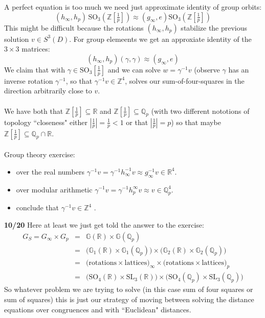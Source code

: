 \documentclass[12pt]{article}
\begin{document}
{A perfect equation is too much we need just approximate identity of group orbits:
$$ (h_\infty, h_p) \,\text{SO}_3 ( \mathbb{Z}[\tfrac{1}{p}] ) \approx (g_\infty, e)\text{SO}_3 ( \mathbb{Z}[\tfrac{1}{p}] ) $$
This might be difficult because the rotations 
$(h_\infty, h_p)$ stabilize the previous solution $v \in S^3(D)$.  For group elemeents we get an approxiate identity of the $3 \times 3$ matrices:
$$ (h_\infty, h_p) (\gamma, \gamma) \approx (g_\infty, e) $$
We claim that with $\gamma \in \text{SO}_3[\frac{1}{p}]$ and we can solve $w = \gamma^{-1}v $ (observe $\gamma$ has an inverse rotation $\gamma^{-1}$, so that $\gamma^{-1}v \in \mathbb{Z}^4$, solves our sum-of-four-squares in the direction arbitrarily close to $v$. \\ \\
We have both that $\mathbb{Z}[\frac{1}{p}] \subseteq \mathbb{R}$ and $\mathbb{Z}[\frac{1}{p}] \subseteq \mathbb{Q}_p$ (with two different nototions of topology ``closeness" either $|\frac{1}{p}| = \frac{1}{p} < 1$ or that $|\frac{1}{p}| = p$) so that maybe $\mathbb{Z}[\frac{1}{p}] \subseteq \mathbb{Q}_p \cap \mathbb{R} $. \\ \\
Group theory exercise:
\begin{itemize}
\item over the real numbers $\gamma^{-1}v = \gamma^{-1} h_\infty^{-1}v \approx g_\infty^{-1} v \in \mathbb{R}^4$.
\item over modular arithmetic $\gamma^{-1}v = \gamma^{-1} h_p^\infty v \approx v \in \mathbb{Q}_p^4$.
\item conclude that $\gamma^{-1} v \in \mathbb{Z}^4$ .
\end{itemize}
\textbf{10/20} Here at least we just get told the answer to the exercise:
\begin{eqnarray*} G_S = G_\infty \times G_p 
&=& \mathbb{G}(\mathbb{R}) \times \mathbb{G}(\mathbb{Q}_p) \\
&=& \big( \mathbb{G}_1(\mathbb{R}) \times \mathbb{G}_1(\mathbb{Q}_p) \big) \times 
\big( \mathbb{G}_2(\mathbb{R}) \times \mathbb{G}_2(\mathbb{Q}_p) \big) \\ 
&=& \big(\text{rotations} \times \text{lattices}\big)_\infty \times \big(\text{rotations} \times \text{lattices}\big)_p \\  
&=& \big(\text{SO}_4(\mathbb{R}) \times \text{SL}_3(\mathbb{R})\big)
\times 
\big(\text{SO}_4(\mathbb{Q}_p) \times \text{SL}_3(\mathbb{Q}_p)\big)  \end{eqnarray*}
So whatever problem we are trying to solve (in this case sum of four squares or sum of  squares) this is just our strategy of moving between solving the distance equations over congruences and with ``Euclidean" distances.
}
\end{document}
